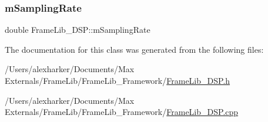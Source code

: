 \mbox{\label{class_frame_lib___d_s_p_ad638dccde211f80eedca3d898f2c6ff6}} 
\subsubsection{\texorpdfstring{m\+Sampling\+Rate}{mSamplingRate}}
{\footnotesize\ttfamily double Frame\+Lib\+\_\+\+D\+S\+P\+::m\+Sampling\+Rate\hspace{0.3cm}{\ttfamily [protected]}}



The documentation for this class was generated from the following files\+:\begin{DoxyCompactItemize}
\item 
/\+Users/alexharker/\+Documents/\+Max Externals/\+Frame\+Lib/\+Frame\+Lib\+\_\+\+Framework/\hyperlink{_frame_lib___d_s_p_8h}{Frame\+Lib\+\_\+\+D\+S\+P.\+h}\item 
/\+Users/alexharker/\+Documents/\+Max Externals/\+Frame\+Lib/\+Frame\+Lib\+\_\+\+Framework/\hyperlink{_frame_lib___d_s_p_8cpp}{Frame\+Lib\+\_\+\+D\+S\+P.\+cpp}\end{DoxyCompactItemize}
